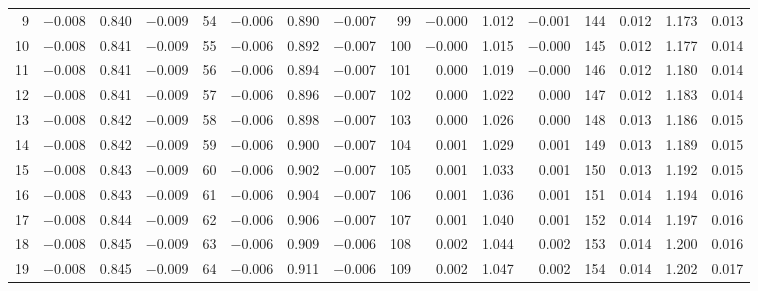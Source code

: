 \begin{table}[!h]
{\begin{tabular}{rrrr|rrrr|rrrr|crrr}
  9 & \tiny{ $-$0.008} &   0.840 & \tiny{ $-$0.009} &  54 & \tiny{ $-$0.006} &   0.890 & \tiny{ $-$0.007} &  99 & \tiny{ $-$0.000} &   1.012 & \tiny{ $-$0.001} & 144 & \tiny{  0.012} &   1.173 & \tiny{  0.013}\\
 10 & \tiny{ $-$0.008} &   0.841 & \tiny{ $-$0.009} &  55 & \tiny{ $-$0.006} &   0.892 & \tiny{ $-$0.007} & 100 & \tiny{ $-$0.000} &   1.015 & \tiny{ $-$0.000} & 145 & \tiny{  0.012} &   1.177 & \tiny{  0.014}\\
 11 & \tiny{ $-$0.008} &   0.841 & \tiny{ $-$0.009} &  56 & \tiny{ $-$0.006} &   0.894 & \tiny{ $-$0.007} & 101 & \tiny{  0.000} &   1.019 & \tiny{ $-$0.000} & 146 & \tiny{  0.012} &   1.180 & \tiny{  0.014}\\
 12 & \tiny{ $-$0.008} &   0.841 & \tiny{ $-$0.009} &  57 & \tiny{ $-$0.006} &   0.896 & \tiny{ $-$0.007} & 102 & \tiny{  0.000} &   1.022 & \tiny{  0.000} & 147 & \tiny{  0.012} &   1.183 & \tiny{  0.014}\\
 13 & \tiny{ $-$0.008} &   0.842 & \tiny{ $-$0.009} &  58 & \tiny{ $-$0.006} &   0.898 & \tiny{ $-$0.007} & 103 & \tiny{  0.000} &   1.026 & \tiny{  0.000} & 148 & \tiny{  0.013} &   1.186 & \tiny{  0.015}\\
 14 & \tiny{ $-$0.008} &   0.842 & \tiny{ $-$0.009} &  59 & \tiny{ $-$0.006} &   0.900 & \tiny{ $-$0.007} & 104 & \tiny{  0.001} &   1.029 & \tiny{  0.001} & 149 & \tiny{  0.013} &   1.189 & \tiny{  0.015}\\
 15 & \tiny{ $-$0.008} &   0.843 & \tiny{ $-$0.009} &  60 & \tiny{ $-$0.006} &   0.902 & \tiny{ $-$0.007} & 105 & \tiny{  0.001} &   1.033 & \tiny{  0.001} & 150 & \tiny{  0.013} &   1.192 & \tiny{  0.015}\\
 16 & \tiny{ $-$0.008} &   0.843 & \tiny{ $-$0.009} &  61 & \tiny{ $-$0.006} &   0.904 & \tiny{ $-$0.007} & 106 & \tiny{  0.001} &   1.036 & \tiny{  0.001} & 151 & \tiny{  0.014} &   1.194 & \tiny{  0.016}\\
 17 & \tiny{ $-$0.008} &   0.844 & \tiny{ $-$0.009} &  62 & \tiny{ $-$0.006} &   0.906 & \tiny{ $-$0.007} & 107 & \tiny{  0.001} &   1.040 & \tiny{  0.001} & 152 & \tiny{  0.014} &   1.197 & \tiny{  0.016}\\
 18 & \tiny{ $-$0.008} &   0.845 & \tiny{ $-$0.009} &  63 & \tiny{ $-$0.006} &   0.909 & \tiny{ $-$0.006} & 108 & \tiny{  0.002} &   1.044 & \tiny{  0.002} & 153 & \tiny{  0.014} &   1.200 & \tiny{  0.016}\\
 19 & \tiny{ $-$0.008} &   0.845 & \tiny{ $-$0.009} &  64 & \tiny{ $-$0.006} &   0.911 & \tiny{ $-$0.006} & 109 & \tiny{  0.002} &   1.047 & \tiny{  0.002} & 154 & \tiny{  0.014} &   1.202 & \tiny{  0.017}\\

\end{tabular}}
\end{table}
